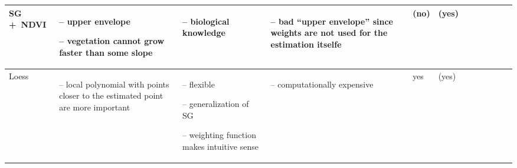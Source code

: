 \begin{table}[!ht]
\begin{tabular}{p{1.6cm}p{3.3cm}p{3.3cm}p{3.4cm}p{0.4cm}p{0.4cm}p{3cm}p{3cm}p{3cm}p{3cm}p{3cm}p{3cm}|}
		SG +~NDVI                                                                                                                                                    &
		\begin{cptitemize} \item[--]  upper envelope \item[--]  vegetation cannot grow faster than some slope                                \end{cptitemize}        &
		\begin{cptitemize} \item[--]  biological knowledge                                                                            \end{cptitemize}               &
		\begin{cptitemize} \item[--]  bad ``upper envelope'' since weights are not used for the estimation itselfe                    \end{cptitemize}               &
		(no)                                                                                                                                                         &
		(yes)                                                                                                                                                         \\ \hline%

		Loess                                                                                                                                                        &
		\begin{cptitemize} \item[--]  local  polynomial with points closer to the estimated point are more important                  \end{cptitemize}               &
		\begin{cptitemize} \item[--]  flexible \item[--]  generalization of SG \item[--]  weighting function makes intuitive sense                  \end{cptitemize} &
		\begin{cptitemize} \item[--]  computationally expensive                                                                       \end{cptitemize}               &
		yes                                                                                                                                                          &
		(yes)                                                                                                                                                         \\ \hline%


\end{tabular}
\end{table}
